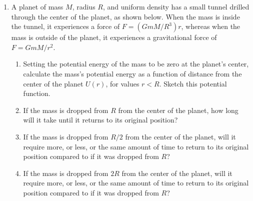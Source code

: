 \documentclass{../../../oss-apphys}
\begin{document}
\begin{enumerate}[leftmargin=15pt]
\item A planet of mass $M$, radius $R$, and uniform density has a small tunnel
  drilled through the center of the planet, as shown below. When the mass is
  inside the tunnel, it experiences a force of $F=(GmM/R^3)r$, whereas when the
  mass is outside of the planet, it experiences a gravitational force of
  $F=GmM/r^2$.
  \begin{center}
  \end{center}
  \begin{enumerate}[noitemsep,leftmargin=20pt]
  \item Setting the potential energy of the mass to be zero at the planet's
    center, calculate the mass's potential energy as a function of distance from
    the center of the planet $U(r)$, for values $r<R$. Sketch this potential
    function.
  \item If the mass is dropped from $R$ from the center of the planet, how long
    will it take until it returns to its original position?
  \item If the mass is dropped from $R/2$ from the center of the planet, will
    it require more, or less, or the same amount of time to return to its
    original position compared to if it was dropped from $R$?
  \item If the mass is dropped from $2R$ from the center of the planet, will
    it require more, or less, or the same amount of time to return to its
    original position compared to if it was dropped from $R$?
  \end{enumerate}
  \newpage


\end{enumerate}
\end{document}
